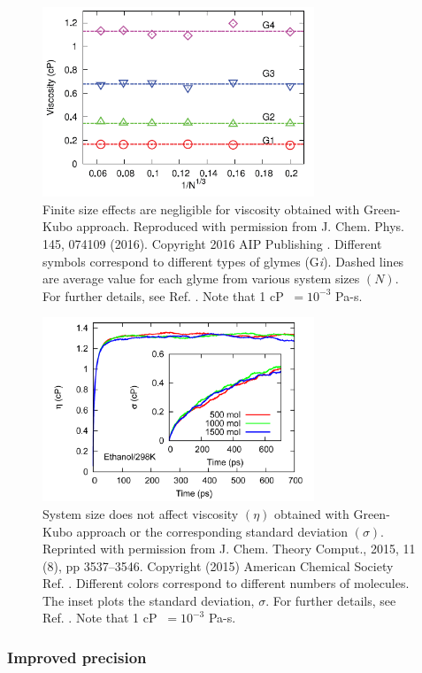 \documentclass[9pt,bestpractices]{livecoms}
\begin{document}
\begin{figure}[htb!]
	\centering
	\includegraphics[width=3.2in]{MoultosFig3.png}
	\caption{Finite size effects are negligible for viscosity obtained with Green-Kubo approach. Reproduced with permission from J. Chem. Phys. 145, 074109 (2016). Copyright 2016 AIP Publishing \cite{Moultos2016}.  Different symbols correspond to different types of glymes (G\textit{i}). Dashed lines are average value for each glyme from various system sizes $(N)$. For further details, see Ref. \cite{Moultos2016}. Note that 1 cP $\ = 10^{-3}$ Pa-s.}
	\label{fig:MoultosFig3}
\end{figure}

\begin{figure}[htb!]
	\centering
	\includegraphics[width=3.2in]{ZhangFig9.png}
	\caption{System size does not affect viscosity $(\eta)$ obtained with Green-Kubo approach or the corresponding standard deviation $(\sigma)$. Reprinted with permission from J. Chem. Theory Comput., 2015, 11 (8), pp 3537–3546. Copyright (2015) American Chemical Society  Ref. \cite{Zhang2015}. Different colors correspond to different numbers of molecules. The inset plots the standard deviation, $\sigma$. For further details, see Ref. \cite{Zhang2015}. Note that 1 cP $\ = 10^{-3}$ Pa-s.}
	\label{fig:ZhangFig9}
\end{figure}

\subsubsection{Improved precision}	\label{sec:Viscosity:General: Improved precision}
\end{document}
